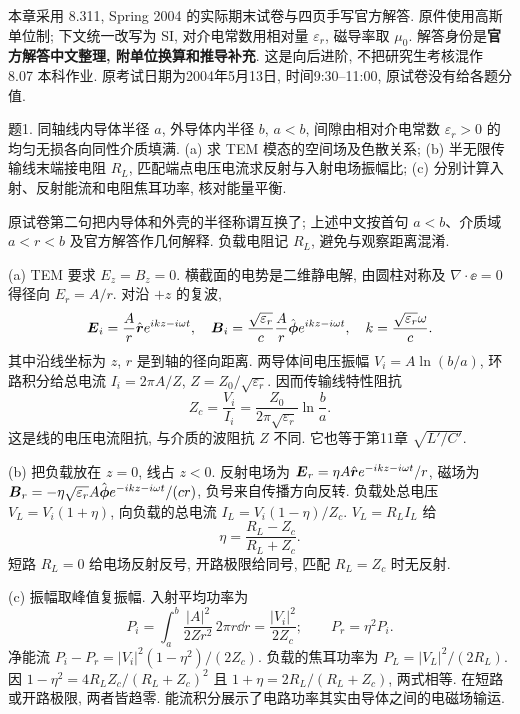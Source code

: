 本章采用 8.311, Spring 2004 的实际期末试卷与四页手写官方解答. 原件使用高斯单位制; 下文统一改写为 SI, 对介电常数用相对量 $\varepsilon_r$, 磁导率取 $\mu_0$. 解答身份是\textbf{官方解答中文整理, 附单位换算和推导补充}. 这是向后进阶, 不把研究生考核混作 8.07 本科作业. 原考试日期为2004年5月13日, 时间9:30--11:00, 原试卷没有给各题分值.

\begin{exercise}
题1. 同轴线内导体半径 $a$, 外导体内半径 $b$, $a<b$, 间隙由相对介电常数 $\varepsilon_r>0$ 的均匀无损各向同性介质填满. (a) 求 TEM 模态的空间场及色散关系; (b) 半无限传输线末端接电阻 $R_L$, 匹配端点电压电流求反射与入射电场振幅比; (c) 分别计算入射、反射能流和电阻焦耳功率, 核对能量平衡.
\end{exercise}
\begin{remark}
原试卷第二句把内导体和外壳的半径称谓互换了; 上述中文按首句 $a<b$、介质域 $a<r<b$ 及官方解答作几何解释. 负载电阻记 $R_L$, 避免与观察距离混淆.
\end{remark}
\begin{solution}
(a) TEM 要求 $E_z=B_z=0$. 横截面的电势是二维静电解, 由圆柱对称及 $\nabla\cdot\ee=0$ 得径向 $E_r=A/r$. 对沿 $+z$ 的复波,
\[
 \boldsymbol{E}_i=\frac{A}{r}\hat{\boldsymbol{r}}e^{ikz-i\omega t},\quad
 \boldsymbol{B}_i=\frac{\sqrt{\varepsilon_r}}c\frac{A}{r}\hat{\boldsymbol{\phi}}e^{ikz-i\omega t},\quad
 k=\frac{\sqrt{\varepsilon_r}\omega}{c}.
\]
其中沿线坐标为 $z$, $r$ 是到轴的径向距离. 两导体间电压振幅 $V_i=A\ln(b/a)$, 环路积分给总电流 $I_i=2\pi A/Z$, $Z=Z_0/\sqrt{\varepsilon_r}$. 因而传输线特性阻抗
\[
 Z_c=\frac{V_i}{I_i}=\frac{Z_0}{2\pi\sqrt{\varepsilon_r}}\ln\frac ba.
\]
这是线的电压电流阻抗, 与介质的波阻抗 $Z$ 不同. 它也等于第11章 $\sqrt{L'/C'}$.

(b) 把负载放在 $z=0$, 线占 $z<0$. 反射电场为 $\boldsymbol{E}_r=\eta A\hat{\boldsymbol{r}}e^{-ikz-i\omega t}/r$, 磁场为 $\boldsymbol{B}_r=-\eta\sqrt{\varepsilon_r}A\hat{\boldsymbol{\phi}}e^{-ikz-i\omega t}/(cr)$, 负号来自传播方向反转. 负载处总电压 $V_L=V_i(1+\eta)$, 向负载的总电流 $I_L=V_i(1-\eta)/Z_c$. $V_L=R_LI_L$ 给
\[
 \eta=\frac{R_L-Z_c}{R_L+Z_c}.
\]
短路 $R_L=0$ 给电场反射反号, 开路极限给同号, 匹配 $R_L=Z_c$ 时无反射.

(c) 振幅取峰值复振幅. 入射平均功率为
\[
 P_i=\int_a^b\frac{|A|^2}{2Zr^2}\,2\pi r\dd r
 =\frac{|V_i|^2}{2Z_c};\qquad P_r=\eta^2P_i.
\]
净能流 $P_i-P_r=|V_i|^2(1-\eta^2)/(2Z_c)$. 负载的焦耳功率为 $P_L=|V_L|^2/(2R_L)$. 因
$1-\eta^2=4R_LZ_c/(R_L+Z_c)^2$ 且 $1+\eta=2R_L/(R_L+Z_c)$, 两式相等. 在短路或开路极限, 两者皆趋零. 能流积分展示了电路功率其实由导体之间的电磁场输运.
\end{solution}


